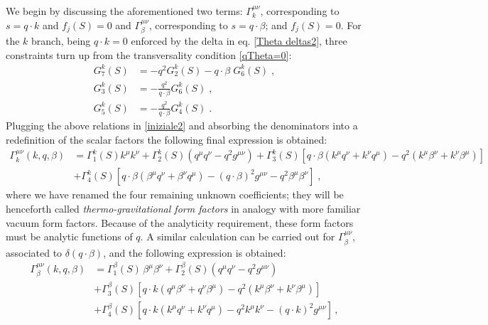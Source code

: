 \documentclass[prd,superscriptaddress,nofootinbib,notitlepage]{revtex4-1}
\begin{document}
We begin by discussing the aforementioned two terms: $\Gamma^{\mu\nu}_k$, corresponding to $s=q\cdot k$ and $f_j(S)=0$ 
and $\Gamma^{\mu\nu}_\beta$, corresponding to $s=q\cdot \beta$; and $f_j(S)=0$. For the $k$ branch, being $q\cdot k=0$ enforced by 
the delta in eq. \eqref{Theta deltas2}, three constraints turn up from the transversality condition 
\eqref{qTheta=0}:
%
\begin{equation*}
    \begin{split}
        G^k_7(S)&=-q^2G^k_2(S)-q\cdot\beta\; G^k_6(S)\;,\\
        G^k_3(S)&=-\frac{q^2}{q\cdot\beta}G^k_6(S)\;,\\
        G^k_5(S)&=-\frac{q^2}{q\cdot\beta}G^k_4(S)\;.
    \end{split}
\end{equation*}
%
Plugging the above relations in \eqref{iniziale2} and absorbing the denominators into a redefinition of the 
scalar factors the following final expression is obtained:
%
\begin{equation}\label{Gammak}
\begin{split}
 \Gamma^{\mu\nu}_k (k,q,\beta)&=\Gamma^{k}_1(S)k^\mu k^\nu+\Gamma^{k}_2(S)
 (q^\mu q^\nu-q^2g^{\mu\nu}) +\Gamma^{k}_3(S)\left[q\cdot\beta\left(k^\mu q^\nu+k^\nu q^\mu\right)-q^2\left(k^\mu\beta^\nu+k^\nu\beta^\mu\right)\right]\\
&+ \Gamma^{k}_4(S)\left[q\cdot\beta\left(\beta^\mu q^\nu+\beta^\nu q^\mu\right)-
\left(q\cdot\beta\right)^2g^{\mu\nu}-q^2\beta^\mu\beta^\nu\right]\;,
\end{split}
\end{equation}
%
where we have renamed the four remaining unknown coefficients; they will be henceforth called {\em thermo-gravitational
form factors} in analogy with more familiar vacuum form factors. Because of the analyticity requirement, these
form factors must be analytic functions of $q$. A similar calculation can be carried out for $\Gamma^{\mu\nu}_\beta$, 
associated to $\delta(q\cdot\beta)$, and the following expression is obtained:
%
\begin{equation}\label{Gammabeta}
    \begin{split}
        \Gamma^{\mu\nu}_{\beta}(k,q,\beta)&=\Gamma^{\beta}_{1}(S)\,\beta^\mu\beta^\nu+
        \Gamma^{\beta}_{2}(S)\left(q^\mu q^\nu-q^2g^{\mu\nu}\right)\\
        &+\Gamma^{\beta}_{3}(S)\left[q\cdot k\left(q^\mu\beta^\nu+q^\nu\beta^\mu\right)-
        q^2\left(k^\mu\beta^\nu+k^\nu\beta^\mu\right)\right]\\
        &+\Gamma^{\beta}_{4}(S)\left[q\cdot k\left(k^\mu q^\nu+k^\nu q^\mu\right)-
        q^2k^\mu k^\nu-(q\cdot k)^2g^{\mu\nu}\right]\,,
    \end{split}
\end{equation}
\end{document}
